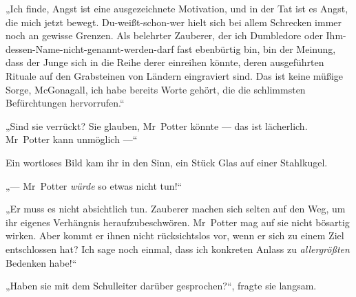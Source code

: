 „Ich finde, Angst ist eine ausgezeichnete Motivation, und in der Tat ist es Angst, die mich jetzt bewegt. Du-weißt-schon-wer hielt sich bei allem Schrecken immer noch an gewisse Grenzen. Als belehrter Zauberer, der ich Dumbledore oder Ihm-dessen-Name-nicht-genannt-werden-darf fast ebenbürtig bin, bin der Meinung, dass der Junge sich in die Reihe derer einreihen könnte, deren ausgeführten Rituale auf den Grabsteinen von Ländern eingraviert sind. Das ist keine müßige Sorge, McGonagall, ich habe bereits Worte gehört, die die schlimmsten Befürchtungen hervorrufen.“

„Sind sie verrückt? Sie glauben, Mr~Potter könnte — das ist lächerlich. Mr~Potter kann unmöglich —“

Ein wortloses Bild kam ihr in den Sinn, ein Stück Glas auf einer Stahlkugel.

„— Mr~Potter \emph{würde} so etwas nicht tun!“

„Er muss es nicht absichtlich tun. Zauberer machen sich selten auf den Weg, um ihr eigenes Verhängnis heraufzubeschwören. Mr~Potter mag auf sie nicht bösartig wirken. Aber kommt er ihnen nicht rücksichtslos vor, wenn er sich zu einem Ziel entschlossen hat? Ich sage noch einmal, dass ich konkreten Anlass zu \emph{allergrößten} Bedenken habe!“

„Haben sie mit dem Schulleiter darüber gesprochen?“, fragte sie langsam.

